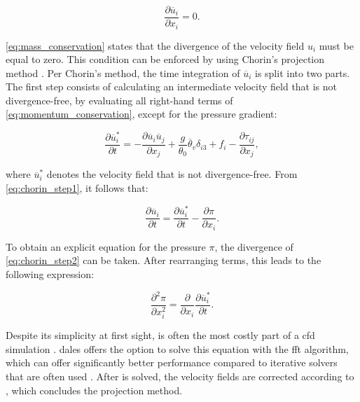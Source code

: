 \begin{equation}
    \frac{\partial \overline{u}_i}{\partial x_i} = 0. \label{eq:mass_conservation}
\end{equation}

\autoref{eq:mass_conservation} states that the divergence of the velocity field $u_i$ must be equal to zero. This condition can be enforced by using Chorin's projection method \citep{chorinNumericalSolutionNavierStokes1967}. Per Chorin's method, the time integration of $\overline{u}_i$ is split into two parts. The first step consists of calculating an intermediate velocity field that is not divergence-free, by evaluating all right-hand terms of \autoref{eq:momentum_conservation}, except for the pressure gradient:

\begin{equation}
    \frac{\partial \overline{u}^*_i}{\partial t} = - \frac{\partial \overline{u}_i \overline{u}_j}{\partial x_j} + \frac{g}{\theta_0}\overline{\theta}_v \delta_{i3} + f_i - \frac{\partial \tau_{ij}}{\partial x_j}, \label{eq:chorin_step1}
\end{equation}

where $\overline{u}^*_i$ denotes the velocity field that is not divergence-free. From \autoref{eq:chorin_step1}, it follows that:

\begin{equation}
    \frac{\partial \overline{u}_i}{\partial t} = \frac{\partial \overline{u}^*_i}{\partial t} - \frac{\partial \pi}{\partial x_i}. \label{eq:chorin_step2}
\end{equation}

To obtain an explicit equation for the pressure $\pi$, the divergence of \autoref{eq:chorin_step2} can be taken. After rearranging terms, this leads to the following expression:

\begin{equation}
    \frac{\partial^2 \pi}{\partial x_i^2} = \frac{\partial}{\partial x_i} \frac{\partial \overline{u}_i^*}{\partial t}. \label{eq:poisson_equation}
\end{equation}

Despite its simplicity at first sight,  is often the most costly part of a \acrshort{cfd} simulation . \acrshort{dales} offers the option to solve this equation with the \acrfull{fft} algorithm, which can offer significantly better performance compared to iterative solvers that are often used \citep{hockneyFastDirectSolution1965}. After  is solved, the velocity fields are corrected according to , which concludes the projection method.

